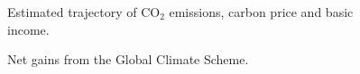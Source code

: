 \documentclass[12pt,english]{article}
\begin{document}
\begin{figure}[h!]
    \caption{Estimated trajectory of CO$_\text{2}$ emissions, carbon price and basic income.}\label{fig:trajectory}
\end{figure}

\begin{figure}[h!]
    \caption{Net gains from the Global Climate Scheme.}\label{fig:median_gain_2015}
\end{figure}
\end{document}

